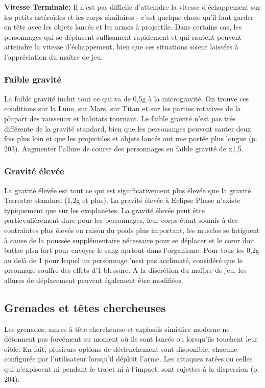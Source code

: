 \textbf{Vitesse Terminale:} Il n'est pas difficile d'atteindre la vitesse d'échappement sur les petits astéroïdes et les corps similaires - c'est quelque chose qu'il faut garder en tête avec les objets lancés et les armes à projectile. Dans certains cas, les personnages qui se déplacent suffisament rapidement et qui sautent peuvent atteindre la vitesse d'échappement, bien que ces situations soient laissées à l'appréciation du maître de jeu. 

\subsubsection{Faible gravité} 

La faible gravité inclut tout ce qui va de 0,5g à la microgravité. On trouve ces conditions sur la Lune, sur Mars, sur Titan et sur les parties rotatives de la plupart des vaisseuax et habitats tournant. Le faible gravité n'est pas trés différente de la gravité standard, bien que les personanges peuvent sauter deux fois plus loin et que les projectiles et objets lancés ont une portée plus longue (p. 203). Augmenter l'allure de course des personnages en faible gravité de x1,5. 

\subsubsection{Gravité élevée} 

La gravité élevée est tout ce qui est significativement plus élevée que la gravité Terrestre standard (1,2g et plus). La gravité élevée à Eclipse Phase n'existe typiquement que sur les exoplanètes. La gravité élevée peut être particvulièrement dure pour les personnages, leur corps étant soumis à des contraintes plus élevés en raison du poids plus important, les muscles se fatiguent à cause de la poussée supplémentaire nécessaire pour se déplacer et le cœur doit battre plsu fort pour envoyer le sang aprtout dans l'organisme. Pour tous les 0,2g au delà de 1 pour lequel un personnage 'nest pas acclimaté, considéré que le prsonnage souffre des effets d'1 blessure. A la discrétion du maîþre de jeu, les allures de déplacement peuvent également être modifiées. 

\subsection{Grenades et têtes chercheuses} \label{sec:combat-grenades-seekers} 

Les grenades, amres à tête chercheurse et explosifs simialire moderne ne détonnent pas forcément au moment où ils sont lancés ou lorsqu'ils touchent leur cible. En fait, plusieurs options de déclenchement sont disponible, chacune configurée par l'utilisateur lorsqu'il déploit l'arme. Les attaques ratées ou celles qui n'explsoent ni pendant le trajet ni à l'impact, sont sujettes à la dispersion (p. 204). 

